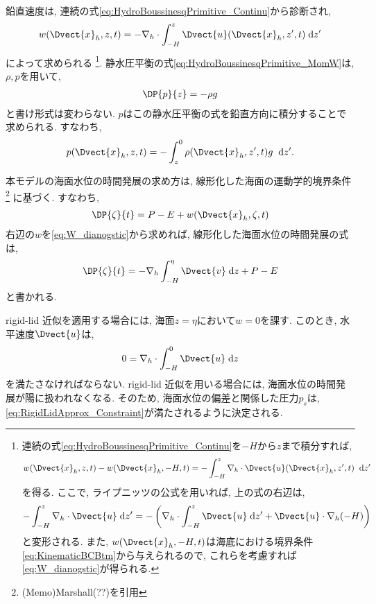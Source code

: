 鉛直速度は, 連続の式\eqref{eq:HydroBoussinesqPrimitive_Continu}から診断され,
\begin{align}
  w(\Dvect{x}_h,z,t) = - \nabla_h \cdot \int_{-H}^z \Dvect{u}(\Dvect{x}_h,z',t) \Dd{z'} 
\label{eq:W_dianogstic}
\end{align}
によって求められる%
\footnote{
連続の式\eqref{eq:HydroBoussinesqPrimitive_Continu}を$-H$から$z$まで積分すれば,
$$
    w(\Dvect{x}_h,z,t) - w(\Dvect{x}_h,-H,t)
  = - \int_{-H}^z \nabla_h \cdot \Dvect{u} (\Dvect{x}_h,z',t) \; \Dd{z'}
$$
を得る.
ここで, ライプニッツの公式を用いれば, 上の式の右辺は, 
$$
     - \int_{-H}^z \nabla_h \cdot \Dvect{u} \Dd{z'}
   = - \left(
         \nabla_h \cdot \int_{-H}^z  \Dvect{u} \Dd{z'}
       +  \Dvect{u} \cdot \nabla_h (-H)
     \right)
$$
と変形される.
また, $w(\Dvect{x}_h,-H,t)$は海底における境界条件\eqref{eq:KinematicBCBtm}から与えられるので,
これらを考慮すれば\eqref{eq:W_dianogstic}が得られる. 
}. 
静水圧平衡の式\eqref{eq:HydroBoussinesqPrimitive_MomW}は, $\rho, p$を用いて, 
\begin{align}
  \DP{p}{z} = - \rho g
\end{align}
と書け形式は変わらない.
$p$はこの静水圧平衡の式を鉛直方向に積分することで求められる.
すなわち,
\begin{align}
  p(\Dvect{x}_h,z,t) = - \int_z^0 \rho(\Dvect{x}_h,z',t) g \; \Dd{z'}. 
\end{align}

本モデルの海面水位の時間発展の求め方は, 線形化した海面の運動学的境界条件%
\footnote{
(Memo)Marshall(??)を引用
}%
に基づく.
すなわち, 
\begin{align}
 \DP{\zeta}{t} =  P - E + w(\Dvect{x}_h,\zeta,t)
\end{align}
右辺の$w$を\eqref{eq:W_dianogstic}から求めれば, 
線形化した海面水位の時間発展の式は, 
\begin{align}
 \DP{\zeta}{t}
 = - \nabla_h \int_{-H}^\eta \Dvect{v} \Dd{z}
   + P - E
\label{eq:LinearizedSeaSurfElev}
\end{align}
と書かれる. 

rigid-lid 近似を適用する場合には,
海面$z=\eta$において$w=0$を課す. 
このとき, 水平速度$\Dvect{u}$は, 
\begin{align}
 0 = \nabla_h \cdot \int_{-H}^0 \Dvect{u} \Dd{z}
\label{eq:RigidLidApprox_Constraint}
\end{align}
を満たさなければならない. 
rigid-lid 近似を用いる場合には, 海面水位の時間発展が陽に扱われなくなる. 
そのため, 海面水位の偏差と関係した圧力$p_s$は, \eqref{eq:RigidLidApprox_Constraint}が満たされるように決定される.

